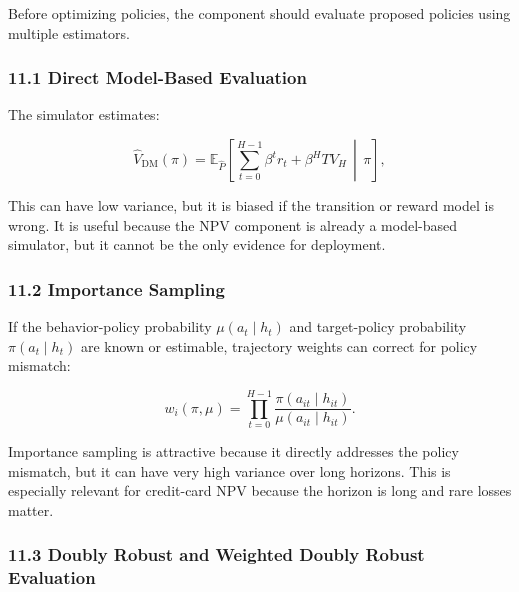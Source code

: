\documentclass[
]{article}
\newcommand{\E}{\mathbb{E}}
\begin{document}
Before optimizing policies, the component should evaluate proposed
policies using multiple estimators.

\hypertarget{direct-model-based-evaluation}{%
\subsubsection{11.1 Direct Model-Based
Evaluation}\label{direct-model-based-evaluation}}

The simulator estimates:

\begin{equation}
  \widehat V_{\mathrm{DM}}(\pi)
  =
  \E_{\widehat P}\!\left[
    \sum_{t=0}^{H-1}\beta^t r_t + \beta^H TV_H
    \,\middle|\, \pi
  \right],
  \label{eq:direct-method-value}
\end{equation}

This can have low variance, but it is biased if the transition or reward
model is wrong. It is useful because the NPV component is already a
model-based simulator, but it cannot be the only evidence for
deployment.

\hypertarget{importance-sampling}{%
\subsubsection{11.2 Importance Sampling}\label{importance-sampling}}

If the behavior-policy probability $\mu(a_t\mid h_t)$ and target-policy
probability $\pi(a_t\mid h_t)$ are known or estimable, trajectory
weights can correct for policy mismatch:

\begin{equation}
  w_i(\pi,\mu)
  =
  \prod_{t=0}^{H-1}
  \frac{\pi(a_{it}\mid h_{it})}{\mu(a_{it}\mid h_{it})}.
  \label{eq:trajectory-is-weight}
\end{equation}

Importance sampling is attractive because it directly addresses the
policy mismatch, but it can have very high variance over long horizons.
This is especially relevant for credit-card NPV because the horizon is
long and rare losses matter.

\hypertarget{doubly-robust-and-weighted-doubly-robust-evaluation}{%
\subsubsection{11.3 Doubly Robust and Weighted Doubly Robust
Evaluation}\label{doubly-robust-and-weighted-doubly-robust-evaluation}}
\end{document}
